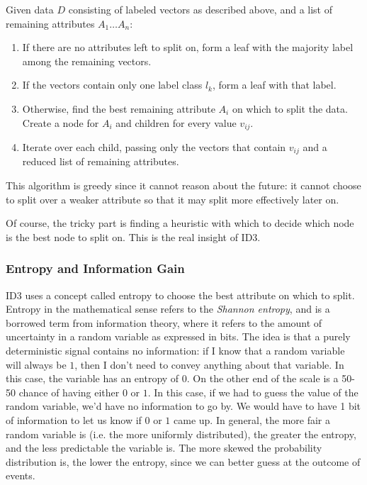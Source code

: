 \documentclass[12pt, letterpaper]{article}
\begin{document}
Given data $D$ consisting of labeled vectors as described above, and a list of remaining attributes $A_1\dots A_n$:

\begin{enumerate}
    \item If there are no attributes left to split on, form a leaf with the majority label among the remaining vectors.
    \item If the vectors contain only one label class $l_k$, form a leaf with that label.
    \item Otherwise, find the best remaining attribute $A_i$ on which to split the data. Create a node for $A_i$ and children for every value $v_{ij}$.
    \item Iterate over each child, passing only the vectors that contain $v_{ij}$ and a reduced list of remaining attributes.
\end{enumerate}

This algorithm is greedy since it cannot reason about the future: it cannot choose to split over a weaker attribute so that it may split more effectively later on.

Of course, the tricky part is finding a heuristic with which to decide which node is the best node to split on. This is the real insight of ID3.

\subsubsection*{Entropy and Information Gain}

ID3 uses a concept called entropy to choose the best attribute on which to split. Entropy in the mathematical sense refers to the \emph{Shannon entropy}, and is a borrowed term from information theory\cite{entropyWikipedia}, where it refers to the amount of uncertainty in a random variable as expressed in bits. The idea is that a purely deterministic signal contains no information: if I know that a random variable will always be $1$, then I don't need to convey anything about that variable. In this case, the variable has an entropy of $0$. On the other end of the scale is a 50-50 chance of having either $0$ or $1$. In this case, if we had to guess the value of the random variable, we'd have no information to go by. We would have to have 1 bit of information to let us know if $0$ or $1$ came up. In general, the more fair a random variable is (i.e. the more uniformly distributed), the greater the entropy, and the less predictable the variable is. The more skewed the probability distribution is, the lower the entropy, since we can better guess at the outcome of events. 
\end{document}
